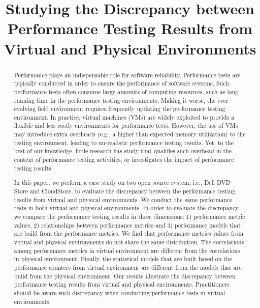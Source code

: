 \documentclass[10pt, conference]{IEEEtran}
\begin{document}
\title{Studying the Discrepancy between Performance Testing Results from Virtual and Physical Environments}

\author{

}

\maketitle

\begin{abstract}
Performance plays an indispensable role for software reliability. 
Performance tests are typically conducted in order to ensure the performance of software systems. Such performance tests often consume large amounts of computing resources, such as long running time in the performance testing environments. Making it worse, the ever evolving field environment requires frequently updating the performance testing environment. In practice, virtual machines (VMs) are widely exploited to provide a flexible and less costly environments for performance tests. However, the use of VMs may introduce extra overheads (e.g., a higher than expected memory utilization) to the testing environment, leading to un-realistic performance testing results. Yet, to the best of our knowledge, little research has study that qualifies such overhead in the context of performance testing activities, or investigates the impact of performance testing results. 
		
In this paper, we perform a case study on two open source system, i.e., Dell DVD Store and CloudStore, to evaluate the discrepancy between the performance testing results from virtual and physical environments. We conduct the same performance tests in both virtual and physical environments. In order to evaluate the discrepancy, we compare the performance testing results in three dimensions: 1) performance metric values, 2) relationships between performance metrics and 3) performance models that are build from the performance metrics. We find that performance metrics values from virtual and physical environments do not share the same distribution. The correlations among performance metrics in virtual environment are different from the correlations in physical environment. Finally, the statistical models that are built based on the performance counters from virtual environment are different from the models that are build from the physical environment. Our results illustrate the discrepancy between performance testing results from virtual and physical environments. Practitioners should be aware such discrepancy when conducting performance tests in virtual environments.



\end{abstract}
\end{document}

